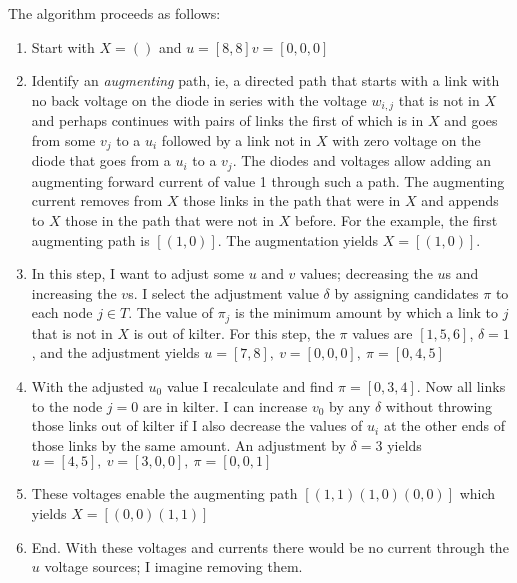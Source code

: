 \documentclass[11pt]{article}
\begin{document}
The algorithm proceeds as follows:
\begin{enumerate}
\item Start with $X=()$ and $u= [ 8,  8] v= [ 0,  0,  0] $
\item Identify an \emph{augmenting} path, ie, a directed path that
  starts with a link with no back voltage on the diode in series with
  the voltage $w_{i,j}$ that is not in $X$ and perhaps continues with
  pairs of links the first of which is in $X$ and goes from some $v_j$
  to a $u_i$ followed by a link not in $X$ with zero voltage on the
  diode that goes from a $u_i$ to a $v_j$.  The diodes and voltages
  allow adding an augmenting forward current of value 1 through such a
  path.  The augmenting current removes from $X$ those links in the
  path that were in $X$ and appends to $X$ those in the path that were
  not in $X$ before.  For the example, the first augmenting path is
  $[(1,0)]$.  The augmentation yields $X=[(1,0)]$.
\item In this step, I want to adjust some $u$ and $v$ values;
  decreasing the $u$s and increasing the $v$s.  I select the
  adjustment value $\delta$ by assigning candidates $\pi$ to each
  node $j\in T$.  The value of $\pi_j$ is the minimum amount by which a
  link to $j$ that is not in $X$ is out of kilter.  For this step, the
  $\pi$ values are $[ 1, 5, 6]$, $\delta=1$, and the adjustment yields
  $u= [ 7, 8],~ v= [ 0, 0, 0],~ \pi= [ 0, 4, 5]$
\item With the adjusted $u_0$ value I recalculate and find
  $\pi=[0,3,4]$.  Now all links to the node $j=0$ are in kilter.  I
  can increase $v_0$ by any $\delta$ without throwing those links out
  of kilter if I also decrease the values of $u_i$ at the other ends
  of those links by the same amount.  An adjustment by $\delta=3$
  yields $u= [ 4, 5],~ v= [ 3, 0, 0],~ \pi= [ 0, 0, 1]$
\item These voltages enable the augmenting path $[(1,1) (1,0) (0,0)]$
  which yields $X= [(0, 0) (1, 1)]$
\item End.  With these voltages and currents there would be no current
  through the $u$ voltage sources; I imagine removing them.
\end{enumerate}
\end{document}
